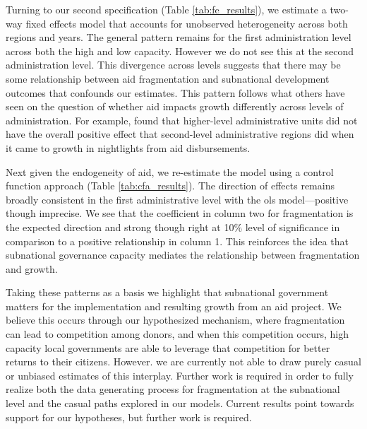 \documentclass[11pt]{article}
\begin{document}
Turning to our second specification (Table \ref{tab:fe_results}), we estimate a two-way fixed effects model that accounts for unobserved heterogeneity across both regions and years. The general pattern remains for the first administration level across both the high and low capacity. However we do not see this at the second administration level. This divergence across levels suggests that there may be some relationship between aid fragmentation and subnational development outcomes that confounds our estimates. This pattern follows what others have seen on the question of whether aid impacts growth differently across levels of administration. For example, \citep{dreher_aid_2015} found that higher-level administrative units did not have the overall positive effect that second-level administrative regions did when it came to growth in nightlights from aid disbursements.

Next given the endogeneity of aid, we re-estimate the model using a control function approach (Table \ref{tab:cfa_results}). The direction of effects remains broadly consistent in the first administrative level with the ols model—positive though imprecise. We see that the coefficient in column two for fragmentation is the expected direction and strong though right at 10$\%$ level of significance in comparison to a positive relationship in column 1.  This reinforces the idea that subnational governance capacity mediates the relationship between fragmentation and growth.

Taking these patterns as a basis we highlight that subnational government matters for the implementation and resulting growth from an aid project. We believe this occurs through our hypothesized mechanism, where fragmentation can lead to competition among donors, and when this competition occurs, high capacity local governments are able to leverage that competition for better returns to their citizens. However. we are currently not able to draw purely casual or unbiased estimates of this interplay. Further work is required in order to fully realize both the data generating process for fragmentation at the subnational level and the casual paths explored in our models. Current results point towards support for our hypotheses, but further work is required. 

\end{document}
